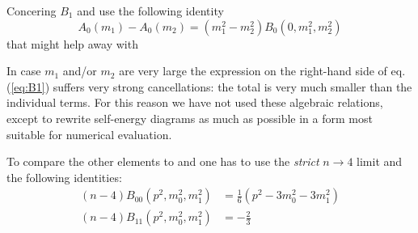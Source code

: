 Concering $B_1$ \cite{Passarino:1978jh} and \LoopTools{} use the following identity
\begin{equation}
A_0(m_1)-A_0(m_2)=(m_1^2-m_2^2)B_0(0,m_1^2,m_2^2)
\end{equation}
that might help away with
\begin{displayquote}
In case $m_1$ and/or $m_2$ are very large the expression on the right-hand side of eq. (\ref{eq:B1}) suffers very strong cancellations: the total is very much smaller than the individual terms. For this reason we have not used these algebraic relations, except to rewrite self-energy diagrams as much as possible in a form most suitable for numerical evaluation.
\end{displayquote}

To compare the other elements to \cite{Passarino:1978jh} and \LoopTools{} one has to use the \textit{strict} $n\rightarrow 4$ limit and the following identities\cite{Denner:2005nn}:
\begin{align}
(n-4) B_{00}(p^2,m_0^2,m_1^2) &= \frac 1 6 (p^2-3m_0^2-3m_1^2)\\
(n-4) B_{11}(p^2,m_0^2,m_1^2) &= -\frac 2 3
\end{align}

